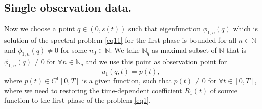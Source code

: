 \documentclass[preprint,12pt,authoryear]{elsarticle}
\begin{document}
\subsection{Single observation data.}\label{sec2} Now we choose a point $q\in (0,s(t))$ such that eigenfunction $\phi_{1,n}(q)$ which is solution of the spectral problem \eqref{eq11} for the first phase is bounded for all $n\in\mathbb{N}$ and $\phi_{1,n}(q)\neq 0$ for some $n_0\in\mathbb{N}$. We take $\mathbb{N}_q$ as maximal subset of $\mathbb{N}$ that is $\phi_{1,n}(q)\neq 0$ for $\forall n\in\mathbb{N}_q$ and we use this point as observation point for 
\begin{equation}\label{eq38}
    u_1(q,t)=p(t),
\end{equation}
where $p(t)\in C^1[0,T]$ is a given function, such that $p(t)\neq 0$ for $\forall t\in[0,T]$, where we need to restoring the time-dependent coefficient $R_1(t)$ of source function to the first phase of the problem \eqref{eq1}.
\end{document}

